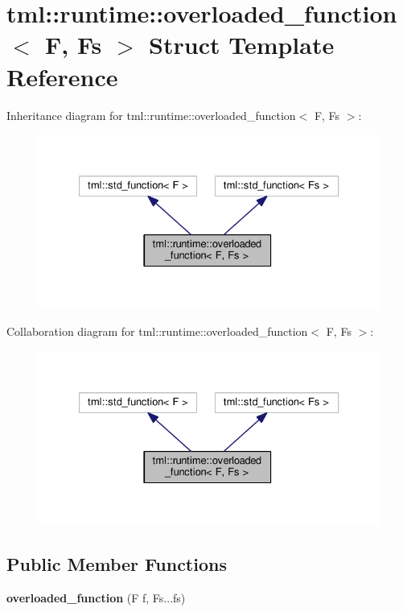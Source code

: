 \hypertarget{structtml_1_1runtime_1_1overloaded__function}{\section{tml\+:\+:runtime\+:\+:overloaded\+\_\+function$<$ F, Fs $>$ Struct Template Reference}
\label{structtml_1_1runtime_1_1overloaded__function}
}


Inheritance diagram for tml\+:\+:runtime\+:\+:overloaded\+\_\+function$<$ F, Fs $>$\+:
\nopagebreak
\begin{figure}[H]
\begin{center}
\leavevmode
\includegraphics[width=329pt]{structtml_1_1runtime_1_1overloaded__function__inherit__graph}
\end{center}
\end{figure}


Collaboration diagram for tml\+:\+:runtime\+:\+:overloaded\+\_\+function$<$ F, Fs $>$\+:
\nopagebreak
\begin{figure}[H]
\begin{center}
\leavevmode
\includegraphics[width=329pt]{structtml_1_1runtime_1_1overloaded__function__coll__graph}
\end{center}
\end{figure}
\subsection*{Public Member Functions}
\begin{DoxyCompactItemize}
\item 
\hypertarget{structtml_1_1runtime_1_1overloaded__function_a63df60f5abad8ca103bb3e8669d08845}{{\bfseries overloaded\+\_\+function} (F f, Fs...\+fs)}\label{structtml_1_1runtime_1_1overloaded__function_a63df60f5abad8ca103bb3e8669d08845}

\end{DoxyCompactItemize}


